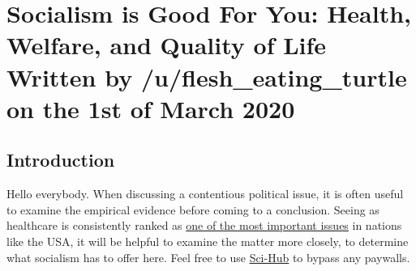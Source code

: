 \section[Socialism is Good For You]{Socialism is Good For You: Health, Welfare, and Quality of Life\\\small{Written by /u/flesh\_eating\_turtle on the 1st of March 2020}}
\subsection*{Introduction}

Hello everybody.
When discussing a contentious political issue, it is often useful to examine the empirical evidence before coming to a conclusion.
Seeing as healthcare is consistently ranked as \href{https://news.gallup.com/poll/276932/several-issues-tie-important-2020-election.aspx}{one of the most important issues} in nations like the USA, it will be helpful to examine the matter more closely, to determine what socialism has to offer here.
Feel free to use \href{https://scihub.bban.top/}{Sci-Hub} to bypass any paywalls.
